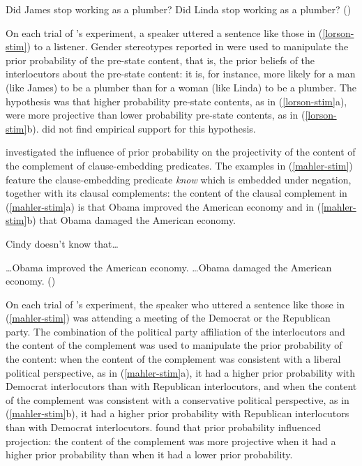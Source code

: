 \documentclass[11pt,fleqn]{article}
\newcommand{\6}{\mbox{$[\hspace*{-.6mm}[$}}
\newcommand{\9}{\mbox{$]\hspace*{-.6mm}]$}}
\newcommand{\citepos}[1]{\citeauthor{#1}'s \citeyear{#1}}
\begin{document}
\begin{exe}
\ex\label{lorson-stim} 
\begin{xlist}
\ex Did James stop working as a plumber?
\ex Did Linda stop working as a plumber? \hfill (\citealt[38]{lorson2018})
\end{xlist}
\end{exe}
On each trial of \citepos{lorson2018} experiment, a speaker uttered a sentence like those in (\ref{lorson-stim}) to a listener. Gender stereotypes reported in \citealt{boyce-etal2018} were used to manipulate the prior probability of the pre-state content, that is, the prior beliefs of the interlocutors about the pre-state content: it is, for instance, more likely for a man (like James) to be a plumber than for a woman (like Linda) to be a plumber. The hypothesis was that higher probability pre-state contents, as in (\ref{lorson-stim}a), were more projective than lower probability pre-state contents, as in (\ref{lorson-stim}b). \citet{lorson2018} did not find empirical support for this hypothesis.

\citet{mahler2020} investigated the influence of prior probability on the projectivity of the content of the complement of clause-embedding predicates. The examples in (\ref{mahler-stim}) feature the clause-embedding predicate {\em know} which is embedded under negation, together with its clausal complements: the content of the clausal complement in (\ref{mahler-stim}a) is that Obama improved the American economy and in (\ref{mahler-stim}b) that Obama damaged the American economy.

\begin{exe}
\ex\label{mahler-stim} Cindy doesn't know that\ldots
\begin{xlist}
\ex \ldots Obama improved the American economy.
\ex \ldots Obama damaged the American economy. \hfill (\citealt[779]{mahler2020})
\end{xlist}
\end{exe}
On each trial of \citepos{mahler2020} experiment, the speaker who uttered a sentence like those in (\ref{mahler-stim}) was attending a meeting of the Democrat or the Republican party. The combination of the political party affiliation of the interlocutors and the content of the complement was used to manipulate the prior probability of the content: when the content of the complement was consistent with a liberal political perspective, as in (\ref{mahler-stim}a), it had a higher prior probability with Democrat interlocutors than with Republican interlocutors, and when the content of the complement was consistent with a conservative political perspective, as in (\ref{mahler-stim}b), it had a higher prior probability with Republican interlocutors than with Democrat interlocutors. \citet{mahler2020} found that prior probability influenced projection: the content of the complement was more projective when it had a higher prior probability than when it had a lower prior probability. 
\end{document}
